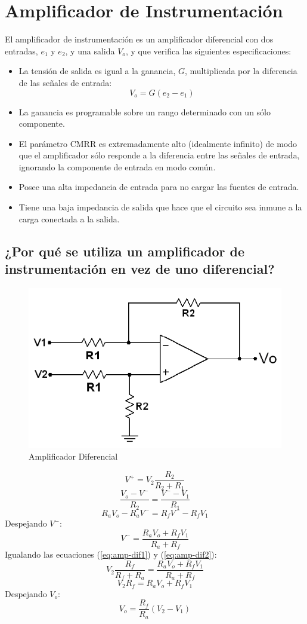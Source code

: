 \chapter{Amplificador de Instrumentación}
El amplificador de instrumentación es un amplificador diferencial con dos entradas, $e_1$ y $e_2$, y una salida $V_o$, y que verifica las siguientes especificaciones:
\begin{itemize}
    \item La tensión de salida es igual a la ganancia, $G$, multiplicada por la diferencia de las señales de entrada:
    \[V_o = G (e_2 - e_1)\]
    \item La ganancia es programable sobre un rango determinado con un sólo componente.
    \item El parámetro CMRR es extremadamente alto (idealmente infinito) de modo que el amplificador sólo responde a la diferencia entre las señales de entrada, ignorando la componente de entrada en modo común.
    \item Posee una alta impedancia de entrada para no cargar las fuentes de entrada.
    \item Tiene una baja impedancia de salida que hace que el circuito sea inmune a la carga conectada a la salida.
\end{itemize}

\section{¿Por qué se utiliza un amplificador de instrumentación en vez de uno diferencial?}
\begin{figure}[H]
    \centering
    \includegraphics[width=0.5\linewidth]{Imagenes/Amplificador Diferencial.png}
    \caption{Amplificador Diferencial}
    \label{fig:amplificador-diferencial}
\end{figure}

\begin{equation}
    V^+ = V_2 \frac{R_2}{R_2 + R_1}
    \label{eq:amp-dif1}
\end{equation}
\[\frac{V_o - V^-}{R_2} = \frac{V^- - V_1}{R_1}\]
\[R_a  V_o - R_a  V^- = R_f  V^- - R_f  V_1\]
Despejando $V^-$:
\begin{equation}
    V^- = \frac{R_a V_o + R_f  V_1}{R_a + R_f}
    \label{eq:amp-dif2}
\end{equation}
Igualando las ecuaciones (\ref{eq:amp-dif1}) y (\ref{eq:amp-dif2}):
\[V_2 \frac{R_f}{R_f + R_a} = \frac{R_a V_o + R_f V_1}{R_a + R_f}\]
\[V_2 R_f = R_a V_o + R_f V_1\]
Despejando $V_o$:
\begin{equation}
    V_o = \frac{R_f}{R_a} (V_2 - V_1)
\end{equation}

